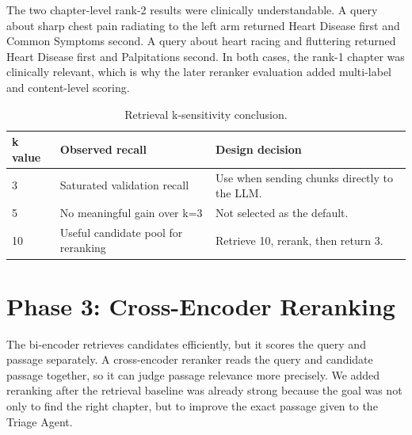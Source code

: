 The two chapter-level rank-2 results were clinically understandable. A query about sharp chest pain radiating to the left arm returned Heart Disease first and Common Symptoms second. A query about heart racing and fluttering returned Heart Disease first and Palpitations second. In both cases, the rank-1 chapter was clinically relevant, which is why the later reranker evaluation added multi-label and content-level scoring.

\begin{table}[htbp]
\centering
\caption{Retrieval k-sensitivity conclusion.}
\label{tab:k_sensitivity}
\begin{tabular}{p{} p{} p{}}
\toprule
\textbf{k value} & \textbf{Observed recall} & \textbf{Design decision}\\
\midrule
3 & Saturated validation recall & Use when sending chunks directly to the LLM.\\
5 & No meaningful gain over k=3 & Not selected as the default.\\
10 & Useful candidate pool for reranking & Retrieve 10, rerank, then return 3.\\
\bottomrule
\end{tabular}
\end{table}

\section{Phase 3: Cross-Encoder Reranking}

The bi-encoder retrieves candidates efficiently, but it scores the query and passage separately. A cross-encoder reranker reads the query and candidate passage together, so it can judge passage relevance more precisely. We added reranking after the retrieval baseline was already strong because the goal was not only to find the right chapter, but to improve the exact passage given to the Triage Agent.

